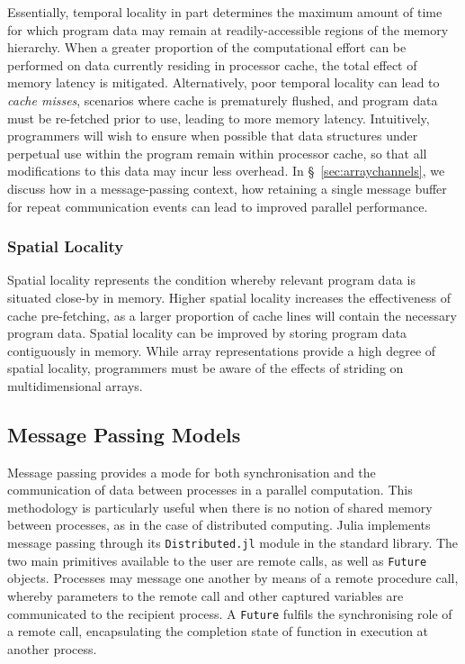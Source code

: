 \documentclass{juliacon}
\begin{document}
Essentially, temporal locality in part determines the maximum amount of
time for which program data may remain at readily-accessible regions of
the memory hierarchy. When a greater proportion of the computational
effort can be performed on data currently residing in processor cache,
the total effect of memory latency is mitigated. Alternatively, poor
temporal locality can lead to \emph{cache misses}, scenarios where cache
is prematurely flushed, and program data must be re-fetched prior to use,
leading to more memory latency. Intuitively, programmers will wish to
ensure when possible that data structures under perpetual use within the
program remain within processor cache, so that all modifications to this
data may incur less overhead. In \S~\ref{sec:arraychannels}, we
discuss how in a message-passing context, how retaining a single message
buffer for repeat communication events can lead to improved parallel
performance.

\subsubsection{Spatial Locality}
\label{sec:spatial-locality}

Spatial locality represents the condition whereby relevant program data is situated close-by in memory. Higher spatial locality increases the effectiveness of cache pre-fetching, as a larger proportion of cache lines will contain the necessary program data. Spatial locality can be improved by storing program data contiguously in memory. While array representations provide a high degree of spatial locality, programmers
must be aware of the effects of striding on multidimensional arrays.

\subsection{Message Passing Models}
\label{sec:message-passing}

Message passing provides a mode for both synchronisation and the
communication of data between processes in a parallel computation. This
methodology is particularly useful when there is no notion of shared
memory between processes, as in the case of distributed computing. Julia
implements message passing through its \texttt{Distributed.jl} module in
the standard library. The two main primitives available to the user are
remote calls, as well as \texttt{Future} objects. Processes may message
one another by means of a remote procedure call, whereby parameters to
the remote call and other captured variables are communicated to the
recipient process. A \texttt{Future} fulfils the synchronising role of
a remote call, encapsulating the completion state of function in
execution at another process.
\end{document}
